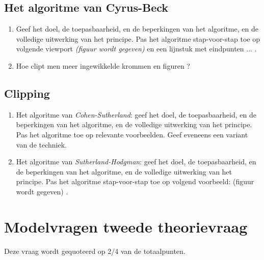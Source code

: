 \documentclass{report}
\begin{document}
	\section{Het algoritme van Cyrus-Beck}
	\begin{enumerate}
		\item Geef het doel, de toepasbaarheid, en de beperkingen van het algoritme, en de volledige uitwerking van het principe. Pas het algoritme stap-voor-stap toe op volgende viewport \textit{(figuur wordt gegeven)} en een lijnstuk met eindpunten ... .  
		
		\item Hoe clipt men meer ingewikkelde krommen en figuren ?
	\end{enumerate}

	\section{Clipping}
	\begin{enumerate}
		\item Het algoritme van \textit{Cohen-Sutherland}: geef het doel, de toepasbaarheid, en de beperkingen van het algoritme, en de volledige uitwerking van het principe. Pas het algoritme toe op relevante voorbeelden. Geef eveneens een variant van de techniek. 
		
		\item Het algoritme van \textit{Sutherland-Hodgman}: geef het doel, de toepasbaarheid, en de beperkingen van het algoritme, en de volledige uitwerking van het principe. Pas het algoritme stap-voor-stap toe op volgend voorbeeld: (figuur wordt gegeven) . 
	\end{enumerate}

	\chapter{Modelvragen tweede theorievraag}
	Deze vraag wordt gequoteerd op 2/4 van de totaalpunten.
	
\end{document}
